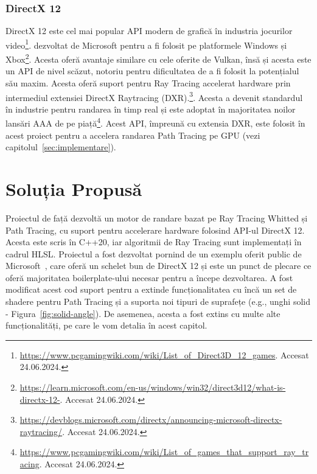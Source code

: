 \documentclass[12pt,a4paper]{report}
\numberwithin{equation}{section} %
\begin{document}
\subsection{DirectX 12}

DirectX 12 este cel mai popular API modern de grafică în industria jocurilor video\footnote{\url{https://www.pcgamingwiki.com/wiki/List_of_Direct3D_12_games}. Accesat 24.06.2024.}.
dezvoltat de Microsoft pentru a fi folosit pe platformele Windows și Xbox\footnote{\url{https://learn.microsoft.com/en-us/windows/win32/direct3d12/what-is-directx-12-}. Accesat 24.06.2024.}.
Acesta oferă avantaje similare cu cele oferite de Vulkan, însă și acesta este
un API de nivel scăzut, notoriu pentru dificultatea de a fi folosit la potențialul său maxim.
Acesta oferă suport pentru Ray Tracing accelerat hardware
prin intermediul extensiei DirectX Raytracing (DXR).\footnote{\url{https://devblogs.microsoft.com/directx/announcing-microsoft-directx-raytracing/}. Accesat 24.06.2024.}.
Acesta a devenit standardul în industrie pentru randarea în timp real și este
adoptat în majoritatea noilor lansări AAA de pe piață\footnote{\url{https://www.pcgamingwiki.com/wiki/List_of_games_that_support_ray_tracing}. Accesat 24.06.2024.}.
Acest API, împreună cu extensia DXR, este folosit în acest proiect pentru
a accelera randarea Path Tracing pe GPU (vezi capitolul~\ref{sec:implementare}).

\chapter{\label{sec:solutie}Soluția Propusă}

Proiectul de față dezvoltă un motor de randare bazat pe Ray Tracing Whitted și Path Tracing, cu suport
pentru accelerare hardware folosind API-ul DirectX 12. Acesta este scris în C++20,
iar algoritmii de Ray Tracing sunt implementați în cadrul HLSL. Proiectul a fost
dezvoltat pornind de un exemplu oferit public de Microsoft~\cite{Schelet},
care oferă un schelet bun de DirectX 12 și este un punct de plecare ce oferă
majoritatea boilerplate-ului necesar pentru a începe dezvoltarea. A fost modificat acest cod
suport pentru a extinde funcționalitatea cu încă un set de shadere pentru Path Tracing și
a suporta noi tipuri de suprafețe (e.g., unghi solid - Figura~\ref{fig:solid-angle}). De asemenea,
acesta a fost extins cu multe alte funcționalități, pe care le vom detalia în acest
capitol.
\end{document}
